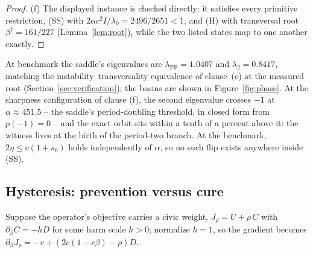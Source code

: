 \documentclass[11pt]{article}
\theoremstyle{definition}
\theoremstyle{remark}
\numberwithin{equation}{section}
\begin{document}
\begin{proof}
(f) The displayed instance is checked directly: it satisfies every primitive restriction, (SS) with $2\alpha c^2 I/\lambda_0 = 2496/2651 < 1$, and (H) with transversal root $\beta^\dagger = 161/227$ (Lemma~\ref{lem:root}), while the two listed states map to one another exactly.
\end{proof}

At benchmark the saddle's eigenvalues are $\lambda_{\mathrm{PF}} = 1.0407$ and $\lambda_2 = 0.8417$, matching the instability--transversality equivalence of clause~(c) at the measured root (Section~\ref{sec:verification}); the basins are shown in Figure~\ref{fig:phase}. At the sharpness configuration of clause (f), the second eigenvalue crosses $-1$ at $\alpha \approx 451.5$ -- the saddle's period-doubling threshold, in closed form from $p(-1) = 0$ -- and the exact orbit sits within a tenth of a percent above it: the witness lives at the birth of the period-two branch. At the benchmark, $2\eta \le c(1+s_0)$ holds independently of $\alpha$, so no such flip exists anywhere inside (SS).

\subsection{Hysteresis: prevention versus cure}\label{sec:hyst}

Suppose the operator's objective carries a civic weight, $J_\rho = U + \rho\,C$ with $\partial_\beta C = -hD$ for some harm scale $h > 0$; normalize $h = 1$, so the gradient becomes $\partial_\beta J_\rho = -v + (2c(1-c\beta) - \rho)D$.
\end{document}
